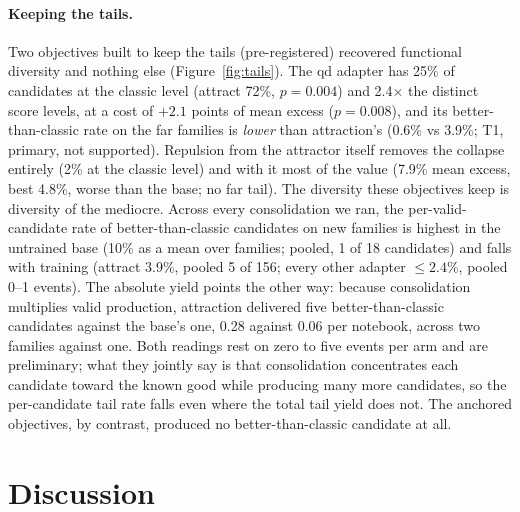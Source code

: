 \documentclass[11pt]{article}
\begin{document}
\paragraph{Keeping the tails.} Two objectives built to keep the tails
(pre-registered) recovered functional diversity and nothing else
(Figure~\ref{fig:tails}). The qd
adapter has 25\% of candidates at the classic level (attract 72\%,
$p=0.004$) and 2.4$\times$ the distinct score levels, at a cost of $+2.1$
points of mean excess ($p=0.008$), and its better-than-classic rate on the
far families is \emph{lower} than attraction's (0.6\% vs 3.9\%; T1, primary,
not supported). Repulsion from the attractor itself removes the collapse
entirely (2\% at the classic level) and with it most of the value (7.9\%
mean excess, best 4.8\%, worse than the base; no far tail). The diversity
these objectives keep is diversity of the mediocre. Across every
consolidation we ran, the per-valid-candidate rate of better-than-classic
candidates on new families is highest in the untrained base (10\% as a
mean over families; pooled, 1 of 18 candidates) and falls with training
(attract 3.9\%, pooled 5 of 156; every other adapter $\le 2.4\%$, pooled
0--1 events). The absolute yield points the other way: because
consolidation multiplies valid production, attraction delivered five
better-than-classic candidates against the base's one, 0.28 against 0.06
per notebook, across two families against one. Both readings rest on zero
to five events per arm and are preliminary; what they jointly say is that
consolidation concentrates each candidate toward the known good while
producing many more candidates, so the per-candidate tail rate falls even
where the total tail yield does not. The anchored objectives, by
contrast, produced no better-than-classic candidate at all.

\section{Discussion}
\label{sec:discussion}
\end{document}

